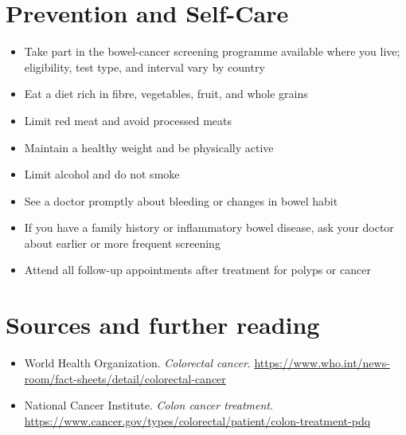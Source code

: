 \section*{Prevention and Self-Care}
\begin{itemize}
    \item Take part in the bowel-cancer screening programme available where you live; eligibility, test type, and interval vary by country
    \item Eat a diet rich in fibre, vegetables, fruit, and whole grains
    \item Limit red meat and avoid processed meats
    \item Maintain a healthy weight and be physically active
    \item Limit alcohol and do not smoke
    \item See a doctor promptly about bleeding or changes in bowel habit
    \item If you have a family history or inflammatory bowel disease, ask your doctor about earlier or more frequent screening
    \item Attend all follow-up appointments after treatment for polyps or cancer
\end{itemize}

\section*{Sources and further reading}
\begin{itemize}
    \item World Health Organization. \textit{Colorectal cancer}. \url{https://www.who.int/news-room/fact-sheets/detail/colorectal-cancer}
    \item National Cancer Institute. \textit{Colon cancer treatment}. \url{https://www.cancer.gov/types/colorectal/patient/colon-treatment-pdq}
\end{itemize}
